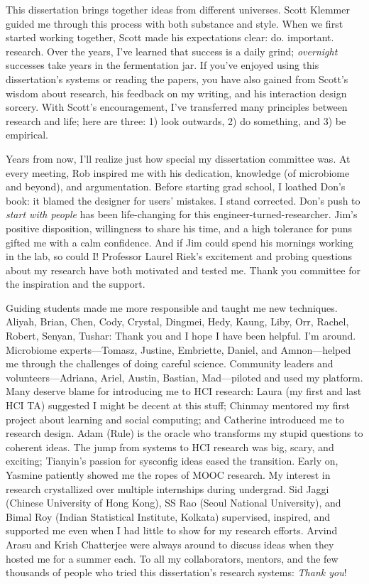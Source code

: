\begin{frontmatter}
\begin{acknowledgements}
This dissertation brings together ideas from different universes. Scott Klemmer guided me through this process with both substance and style. When we first started working together, Scott made his expectations clear: do. important. research. Over the years, I’ve learned that success is a daily grind; \textit{overnight} successes take years in the fermentation jar. If you’ve enjoyed using this dissertation’s systems or reading the papers, you have also gained from Scott’s wisdom about research, his feedback on my writing, and his interaction design sorcery. With Scott’s encouragement, I’ve transferred many principles between research and life; here are three: 1) look outwards, 2) do something, and 3) be empirical.

Years from now, I'll realize just how special my dissertation committee was. At every meeting, Rob inspired me with his dedication, knowledge (of microbiome and beyond), and argumentation. Before starting grad school, I loathed Don’s book: it blamed the designer for users’ mistakes. I stand corrected. Don’s push to \textit{start with people} has been life-changing for this engineer-turned-researcher. Jim’s positive disposition, willingness to share his time, and a high tolerance for puns gifted me with a calm confidence. And if Jim could spend his mornings working in the lab, so could I! Professor Laurel Riek’s excitement and probing questions about my research have both motivated and tested me. Thank you committee for the inspiration and the support. 

Guiding students made me more responsible and taught me new techniques. Aliyah, Brian, Chen, Cody, Crystal, Dingmei, Hedy, Kaung, Liby, Orr, Rachel, Robert, Senyan, Tushar: Thank you and I hope I have been helpful. I’m around. Microbiome experts---Tomasz, Justine, Embriette, Daniel, and Amnon---helped me through the challenges of doing careful science. Community leaders and volunteers---Adriana, Ariel, Austin, Bastian, Mad---piloted and used my platform. Many deserve blame for introducing me to HCI research: Laura (my first and last HCI TA) suggested I might be decent at this stuff; Chinmay mentored my first project about learning and social computing; and Catherine introduced me to research design. Adam (Rule) is the oracle who transforms my stupid questions to coherent ideas. The jump from systems to HCI research was big, scary, and exciting; Tianyin’s passion for sysconfig ideas eased the transition. Early on, Yasmine patiently showed me the ropes of MOOC research. My interest in research crystallized over multiple internships during undergrad. Sid Jaggi (Chinese University of Hong Kong), SS Rao (Seoul National University), and Bimal Roy (Indian Statistical Institute, Kolkata) supervised, inspired, and supported me even when I had little to show for my research efforts. Arvind Arasu and Krish Chatterjee were always around to discuss ideas when they hosted me for a summer each. To all my collaborators, mentors, and the few thousands of people who tried this dissertation's research systems: \textit{Thank you}!


\end{acknowledgements}
\end{frontmatter}
